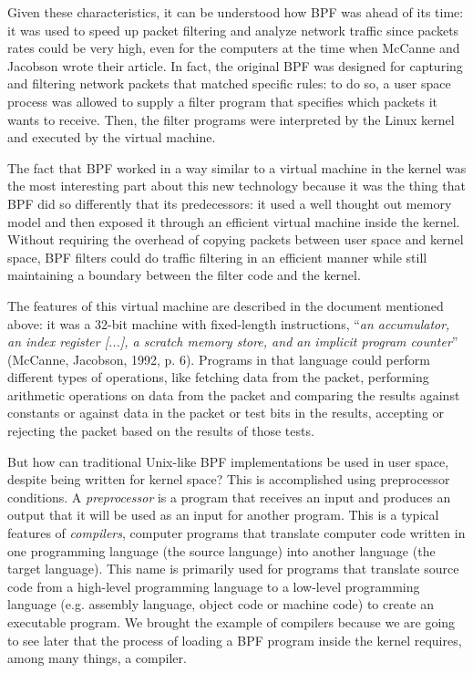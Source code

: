 Given these characteristics, it can be understood how BPF was ahead of its time: it was used to speed up packet filtering and analyze network traffic since packets rates could be very high, even for the computers at the time when McCanne and Jacobson wrote their article. 
In fact, the original BPF was designed for capturing and filtering network packets that matched specific rules: to do so, a user space process was allowed to supply a filter program that specifies which packets it wants to receive.
Then, the filter programs were interpreted by the Linux kernel and executed by the virtual machine.

The fact that BPF worked in a way similar to a virtual machine in the kernel was the most interesting part about this new technology because it was the thing that BPF did so differently that its predecessors: it used a well thought out memory model and then exposed it through an efficient virtual machine inside the kernel. 
Without requiring the overhead of copying packets between user space and kernel space, BPF filters could do traffic filtering in an efficient manner while still maintaining a boundary between the filter code and the kernel.

The features of this virtual machine are described in the document mentioned above: it was a 32-bit machine with fixed-length instructions, ``\textit{an accumulator, an index register [...], a scratch memory store, and an implicit program counter}'' (McCanne, Jacobson, 1992, p. 6).
Programs in that language could perform different types of operations, like fetching data from the packet, performing arithmetic operations on data from the packet and comparing the results against constants or against data in the packet or test bits in the results, accepting or rejecting the packet based on the results of those tests.

But how can traditional Unix-like BPF implementations be used in user space, despite being written for kernel space? 
This is accomplished using preprocessor conditions.
A \textit{preprocessor} is a program that receives an input and produces an output that it will be used as an input for another program.
This is a typical features of \textit{compilers}, computer programs that translate computer code written in one programming language (the source language) into another language (the target language). 
This name is primarily used for programs that translate source code from a high-level programming language to a low-level programming language (e.g. assembly language, object code or machine code) to create an executable program.
We brought the example of compilers because we are going to see later that the process of loading a BPF program inside the kernel requires, among many things, a compiler.

